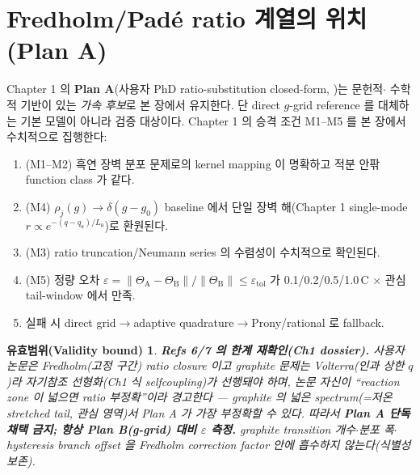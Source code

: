\documentclass[11pt,a4paper]{article}
\newtheorem*{boundbox}{유효범위(Validity bound)}
\begin{document}
\section{Fredholm/Padé ratio 계열의 위치 (Plan A)}\label{sec:ch6_fredholm}
Chapter 1 의 \textbf{Plan A}(사용자 PhD ratio-substitution closed-form, \cite{lee2011,son2013})는 문헌적$\cdot$
수학적 기반이 있는 \emph{가속 후보}로 본 장에서 유지한다. 단 direct $g$-grid reference 를 대체하는 기본 모델이
아니라 검증 대상이다. Chapter 1 의 승격 조건 M1--M5 를 본 장에서 수치적으로 집행한다:
\begin{enumerate}[label=F\arabic*),leftmargin=2.2em]
\item (M1--M2) 흑연 장벽 분포 문제로의 kernel mapping 이 명확하고 적분 안팎 function class 가 같다.
\item (M4) $\rho_j(g)\to\delta(g-g_0)$ baseline 에서 단일 장벽 해(Chapter 1 single-mode
  $r\propto e^{-(q-q_a)/L_0}$)로 환원된다.
\item (M3) ratio truncation/Neumann series 의 수렴성이 수치적으로 확인된다.
\item (M5) 정량 오차
  $\varepsilon=\lVert\Theta_{\mathrm A}-\Theta_{\mathrm B}\rVert/\lVert\Theta_{\mathrm B}\rVert\le\varepsilon_{\mathrm{tol}}$
  가 0.1/0.2/0.5/1.0\,C $\times$ 관심 tail-window 에서 만족.
\item 실패 시 direct grid$\to$adaptive quadrature$\to$Prony/rational 로 fallback.
\end{enumerate}
\begin{boundbox}
\textbf{Refs 6/7 의 한계 재확인(Ch1 dossier).} 사용자 논문은 \emph{Fredholm}(고정 구간) ratio closure 이고
graphite 문제는 \emph{Volterra}(인과 상한 $q$)라 자기참조 선형화(Ch1 식 selfcoupling)가 선행돼야 하며, 논문
자신이 ``reaction zone 이 넓으면 ratio 부정확''이라 경고한다 — graphite 의 넓은 spectrum(=저온 stretched
tail, 관심 영역)서 Plan A 가 가장 부정확할 수 있다. 따라서 \textbf{Plan A 단독 채택 금지; 항상 Plan B(g-grid)
대비 $\varepsilon$ 측정.} graphite transition 개수$\cdot$분포 폭$\cdot$hysteresis branch offset 을 Fredholm
correction factor 안에 흡수하지 않는다(식별성 보존).
\end{boundbox}

\end{document}

